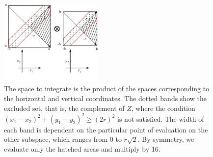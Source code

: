 \documentclass[superscriptaddress,pre,reprint,showpacs,twocolumn]{revtex4-1}
\begin{document}
\begin{figure}[h]
  \begin{center}
    \includegraphics[width=0.45\textwidth]{figures/diagramintegra01.pdf}
  \end{center}
  \caption{The space to integrate is the product of the spaces
    corresponding to the horizontal and vertical coordinates. The dotted
    bands show the excluded set, that is, the complement of $Z$, where the condition 
    $ (x_1-x_2)^2 + (y_1-y_2)^2 \ge (2r)^2 $ is not satisfied.
    The width of each band is dependent on the particular 
    point of evaluation
    on the other subspace, which ranges from 0 to $r\sqrt{2}$. By symmetry, 
    we evaluate only the hatched areas and multiply by 16. 
    \label{diagintegral01}  
    }
\end{figure}
\end{document}
